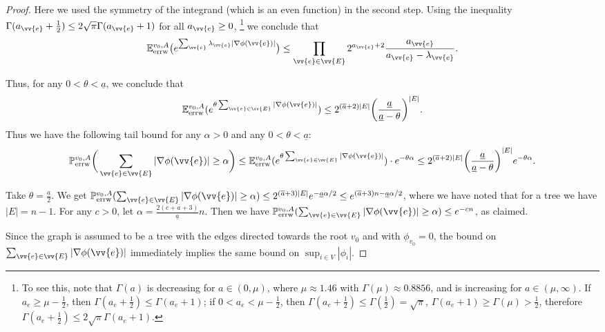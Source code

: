 \documentclass[a4paper, 11pt]{article}
\renewcommand{\P}{\mathbb{P}}
\newcommand{\E}{\mathbb{E}}
\newcommand{\Eerrw}{\E_{\textnormal{errw}}}
\newcommand{\Perrw}{\P_{\textnormal{errw}}}
\begin{document}
\begin{proof}
Here we used the symmetry of the integrand (which is an even function) in the second step. Using the inequality \( \Gamma(a_{\vv{e}} + \frac{1}{2}) \leq 2\sqrt{\pi} \Gamma(a_{\vv{e}}+1) \) for all \( a_{\vv{e}} \geq 0 \), \footnote{To see this, note that $\Gamma(a)$ is decreasing for $a \in (0, \mu)$, where $\mu\approx1.46$ with $\Gamma(\mu) \approx 0.8856$, and is increasing for $a \in (\mu,\infty)$. If $a_e \geq \mu-\frac{1}{2}$, then $\Gamma(a_e+\frac{1}{2})\leq \Gamma(a_e+1)$; if $0 < a_e<\mu-\frac{1}{2}$, then $\Gamma(a_e+\frac{1}{2})\leq \Gamma(\frac{1}{2})=\sqrt{\pi}$, $\Gamma(a_e+1)\geq\Gamma(\mu)>\frac{1}{2}$, therefore $\Gamma(a_e+\frac{1}{2})\leq 2\sqrt{\pi}\Gamma(a_e+1)$.} we conclude that
\[
\Eerrw^{v_0,A}\big(e^{\sum_{\vv{e}}\lambda_{\vv{e}} |\nabla\phi(\vv{e})|}\big) \leq \prod_{\vv{e} \in \vv{E}} 2^{a_{\vv{e}}+2} \frac{a_{\vv{e}}}{a_{\vv{e}} - \lambda_{\vv{e}}}.
\]

Thus, for any \( 0 < \theta < \underline{a} \), we conclude that
\[
\Eerrw^{v_0,A}(e^{\theta \sum_{\vv{e} \in \vv{E}} |\nabla\phi(\vv{e})|}) \leq 2^{(\overline{a}+2)|E|} \bigg(\frac{\underline{a}}{\underline{a} - \theta}\bigg)^{|E|}.
\]
Thus we have the following tail bound for any $\alpha>0$ and any \( 0 < \theta < \underline{a} \):
\[\Perrw^{v_0,A}\bigg(\sum_{\vv{e} \in \vv{E}} |\nabla\phi(\vv{e})|\geq \alpha\bigg)\leq \Eerrw^{v_0,A}(e^{\theta \sum_{\vv{e} \in \vv{E}} |\nabla\phi(\vv{e})|})\cdot e^{-\theta \alpha}\leq 2^{(\overline{a}+2)|E|}\bigg(\frac{\underline{a}}{\underline{a}-\theta}\bigg)^{|E|}e^{-\theta \alpha}.\]

Take $\theta =\frac{\underline{a}}{2}$. We get $\Perrw^{v_0,A}(\sum_{\vv{e} \in \vv{E}} |\nabla\phi(\vv{e})|\geq \alpha)\leq 2^{(\overline{a}+3)|E|}e^{-\underline{a}\alpha/2}\leq e^{(\overline{a}+3)n-\underline{a}\alpha/2}$,
where we have noted that for a tree we have $|E|=n-1$. For any $c>0$, let $\alpha=\frac{2(c+\overline{a}+3)}{\underline{a}}n$. Then we have $\Perrw^{v_0,A}(\sum_{\vv{e} \in \vv{E}} |\nabla\phi(\vv{e})|\geq \alpha)\leq e^{-cn}$, as claimed.

Since the graph is assumed to be a tree with the edges directed towards the root $v_0$ and with 
$\phi_{v_0} = 0$, the bound on 
$\sum_{\vv{e} \in \vv{E}} |\nabla\phi(\vv{e})|$
immediately implies the same bound on 
$\sup_{i\in V}|\phi_i|$.
\end{proof}
\end{document}

